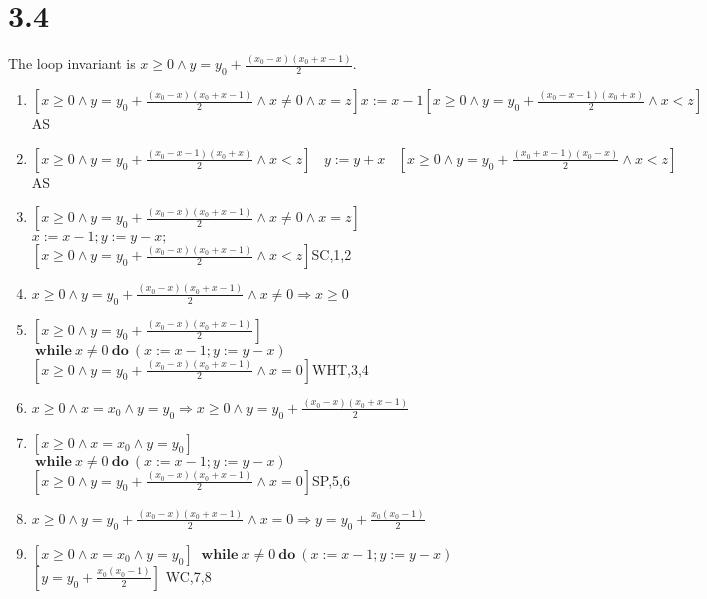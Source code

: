 \documentclass[a4papers]{ctexart}
\newcommand{\bwhile}{\ \boldsymbol{while}\ }
\newcommand{\bdo}{\ \boldsymbol{do}\ }
\newcommand{\tab}{\ \ \ \ }
\newcommand{\w}{\wedge }
\begin{document}
\section*{3.4}
\noindent The loop invariant is $x \ge 0 \w y=y_0 + \frac{(x_0-x)(x_0+x-1)}{2}$.
\begin{enumerate}
    \item $[x\ge 0 \w y=y_0 + \frac{(x_0-x)(x_0+x-1)}{2} \w x\ne 0 \w x=z] x:=x-1
            [x\ge 0 \w y=y_0 + \frac{(x_0-x-1)(x_0+x)}{2}  \w x<z] $\hfill AS
    \item $[x\ge 0 \w y=y_0 + \frac{(x_0-x-1)(x_0+x)}{2}  \w x<z] \tab y:=y+x \tab 
            [x\ge 0 \w y=y_0 + \frac{(x_0+x-1)(x_0-x)}{2}  \w x<z]$\hfill AS
    \item $[x\ge 0 \w y=y_0 + \frac{(x_0-x)(x_0+x-1)}{2} \w x\ne 0 \w x=z]$\\
            $ x:=x-1;y:=y-x;$\\
            $ [x\ge 0 \w y=y_0 + \frac{(x_0-x)(x_0+x-1)}{2} \w x<z]$\hfill SC,1,2
    \item $x \ge 0 \w y=y_0 + \frac{(x_0-x)(x_0+x-1)}{2} \w x\ne 0 \Rightarrow x\ge 0$
    \item $[x \ge 0 \w y=y_0 + \frac{(x_0-x)(x_0+x-1)}{2}]$\\
           $\bwhile x\ne 0 \bdo (x:=x-1;y:=y-x)$\\
           $[x \ge 0 \w y=y_0 + \frac{(x_0-x)(x_0+x-1)}{2} \w x=0]$\hfill WHT,3,4
    \item $x\ge 0\w x=x_0 \w y=y_0 \Rightarrow x \ge 0 \w y=y_0 + \frac{(x_0-x)(x_0+x-1)}{2}$
    \item $[x\ge 0\w x=x_0 \w y=y_0]$\\
            $\bwhile x\ne 0 \bdo (x:=x-1;y:=y-x)$\\
            $[x \ge 0 \w y=y_0 + \frac{(x_0-x)(x_0+x-1)}{2} \w x=0]$\hfill SP,5,6
    \item $x \ge 0 \w y=y_0 + \frac{(x_0-x)(x_0+x-1)}{2} \w x=0 \Rightarrow y=y_0 + \frac{x_0(x_0-1)}{2}$
    \item $[x\ge 0\w x=x_0 \w y=y_0]$
            $\bwhile x\ne 0 \bdo (x:=x-1;y:=y-x)$
            $[y = y_0 + \frac{x_0(x_0-1)}{2} ]$       \hfill WC,7,8
\end{enumerate}
\end{document}
